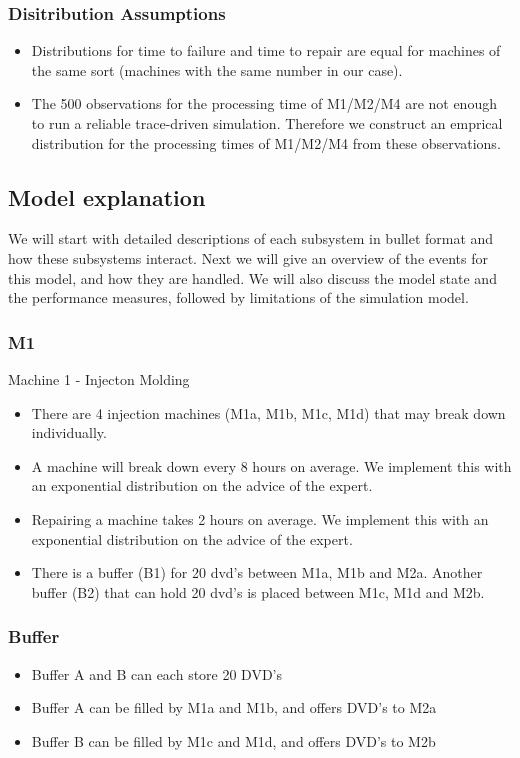 \documentclass[11pt,a4paper]{article}
\begin{document}
\subsubsection{Disitribution Assumptions}
\begin{itemize}
\item Distributions for time to failure and time to repair are equal for machines of the same sort (machines with the same number in our case).
\item The 500 observations for the processing time of M1/M2/M4 are not enough to run a reliable trace-driven simulation. Therefore we construct an emprical distribution for the processing times of M1/M2/M4 from these observations. 
\end{itemize}


\subsection{Model explanation}
We will start with detailed descriptions of each subsystem in bullet format and how these subsystems interact. Next we will give an overview of the events for this model, and how they are handled. We will also discuss the model state and the performance measures, followed by limitations of the simulation model. 

\subsubsection{M1}
Machine 1 - Injecton Molding
\begin{itemize}
\item There are 4 injection machines (M1a, M1b, M1c, M1d)  that may break down individually. 
\item  A machine will break down every 8 hours on average. We implement this with an exponential distribution on the advice of the expert. 
\item  Repairing a machine takes 2 hours on average. We implement this with an exponential distribution on the advice of the expert. 
\item  There is a buffer (B1) for 20 dvd's between M1a, M1b and M2a. Another buffer (B2) that can hold 20 dvd's is placed between M1c, M1d and M2b. 
\end{itemize}

\subsubsection{Buffer}
\begin{itemize}
\item Buffer A and B can each store 20 DVD's
\item Buffer A can be filled by M1a and M1b, and offers DVD's to M2a
\item Buffer B can be filled by M1c and M1d, and offers DVD's to M2b
\end{itemize}
\end{document}
